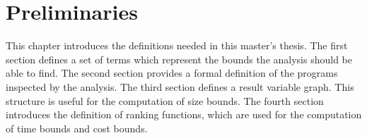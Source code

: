 \section{Preliminaries}

This chapter introduces the definitions needed in this master's thesis.
The first section defines a set of terms which represent the bounds the analysis should be able to find. 
The second section provides a formal definition of the programs inspected by the analysis.
The third section defines a result variable graph.
This structure is useful for the computation of size bounds.
The fourth section introduces the definition of ranking functions, which are used for the computation of time bounds and cost bounds.









